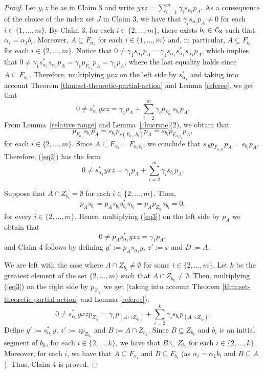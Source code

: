 \documentclass[a4paper,12pt]{amsart}
\theoremstyle{definition}
\theoremstyle{remark}
\numberwithin{equation}{section}
\newcommand{\osf}{{\normalfont \textsf{X}}}
\newcommand{\lang}{\CL_{\osf}}
\newcommand{\CL}{\mathcal{L}}
\begin{document}
\begin{proof}
Let $y,z$ be as in Claim 3 and write $yxz=\sum\limits_{i=1}^m\gamma_i s_{\alpha_i}p_A$. As a consequence of the choice of the index set $J$ in Claim 3, we have that $\gamma_is_{\alpha_i}p_{A}\neq 0$ for each $i\in \{1,...,m\}$. By Claim 3, for each $i\in \{2,...,m\}$, there exists $b_i\in \lang$ such that $\alpha_i=\alpha_1b_i$. Moreover, $A\subseteq F_{\alpha_i}$ for each $i\in \{1,...,m\}$ and, in particular, $A\subseteq F_{b_i}$ for each $i\in \{2,...,m\}$. Notice that $0\neq \gamma_1s_{\alpha_1}p_A=\gamma_1s_{\alpha_1}s_{\alpha_1}^*s_{\alpha_1}p_A$, which implies that $0\neq \gamma_1s_{\alpha_1}^*s_{\alpha_1}p_A=\gamma_1 p_{F_{\alpha_1}}p_A=\gamma_1 p_A$, where the last equality holds since $A\subseteq F_{\alpha_1}$. Therefore, multiplying $yxz$ on the left side by $s_{\alpha_1}^*$ and taking into account Theorem \ref{thm:set-theoretic-partial-action} and Lemma \ref{referee}, we get that
\begin{equation}\label{eq2} 0 \neq s_{\alpha_1}^*yxz=\gamma_1 p_A + \sum\limits_{i=2}^m \gamma_i p_{F_{\alpha_1}}s_{b_i}p_A.
\end{equation}
From Lemma~\ref{relative range} and Lemma~\ref{chucrute}(2), we obtain that
$$p_{F_{\alpha_1}}s_{b_i}p_A=s_{b_i}p_{r(F_{\alpha_1}, b_i)}p_A=s_{b_i}p_{F_{\alpha_1b_i}}p_A,$$
for each $i\in \{2,...,m\}$.
Since $A\subseteq F_{\alpha_i}= F_{\alpha_1b_i}$, we conclude that $s_{_ib}p_{F_{\alpha_1b_i}}p_A=s_{b_i}p_A.$ Therefore, (\ref{eq2}) has the form 
\begin{equation}\label{eq3}
0\neq s_{\alpha_1}^*yxz=\gamma_1 p_A+\sum\limits_{i=2}^m\gamma_i s_{b_i}p_A.
\end{equation}

Suppose that $A\cap Z_{b_i}=\emptyset$ for each $i\in \{2,...,m\}$. Then, 
$$p_As_{b_i}=p_A s_{b_i}s_{b_i}^*s_{b_i}=p_A p_{Z_{b_i}}s_{b_i}=0,$$ for every $i\in \{2,...,m\}$. Hence, multiplying (\ref{eq3}) on the left side by $p_A$ we obtain that
$$0\neq p_A s_{\alpha_1}^*yxz=\gamma_1 p_A,$$
and Claim 4 follows by defining $y':=p_As_{\alpha_1}y$, $z':=x$ and $D:=A$.

We are left with the case where $A\cap Z_{b_i}\neq \emptyset$ for some $i\in \{2,...,m\}$. Let $k$ be the greatest element of the set $ \{2,...,m\}$ such that $A\cap Z_{b_k}\neq \emptyset$. Then, multiplying (\ref{eq3}) on the right side by $p_{Z_{b_k}}$ we get (taking into account Theorem \ref{thm:set-theoretic-partial-action} and Lemma \ref{referee}):
$$0\neq s_{\alpha_1}^*yxzp_{Z_{b_k}}=\gamma_1 p_{(A\cap Z_{b_k})}+\sum\limits_{i=2}^k \gamma_i s_{b_i}p_{(A\cap Z_{b_k})}.$$ Define $y':=s_{\alpha_1}^*y$, $z':=zp_{Z_{b_k}}$ and $B:=A\cap Z_{b_k}$. Since $B\subseteq Z_{b_k}$ and $b_i$ is an initial segment of $b_k$, for each $i\in \{2,...,k\}$, we have that $B\subseteq Z_{b_i}$ for each $i\in \{2,...,k\}$. Moreover, for each $i$, we have that $A\subseteq F_{\alpha_i}$ and $B\subseteq F_{b_i}$ (as 
$\alpha_i=\alpha_1b_i$ and $B\subseteq A$). Thus, Claim 4 is proved.


\end{proof}
\end{document}
